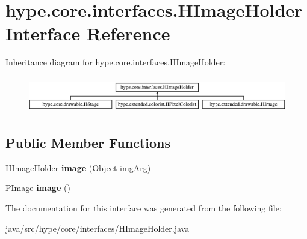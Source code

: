 \hypertarget{interfacehype_1_1core_1_1interfaces_1_1_h_image_holder}{\section{hype.\-core.\-interfaces.\-H\-Image\-Holder Interface Reference}
\label{interfacehype_1_1core_1_1interfaces_1_1_h_image_holder}
}
Inheritance diagram for hype.\-core.\-interfaces.\-H\-Image\-Holder\-:\begin{figure}[H]
\begin{center}
\leavevmode
\includegraphics[height=1.616162cm]{interfacehype_1_1core_1_1interfaces_1_1_h_image_holder}
\end{center}
\end{figure}
\subsection*{Public Member Functions}
\begin{DoxyCompactItemize}
\item 
\hypertarget{interfacehype_1_1core_1_1interfaces_1_1_h_image_holder_a6ef8bf715aa1278f1ada5160d28a4fe9}{\hyperlink{interfacehype_1_1core_1_1interfaces_1_1_h_image_holder}{H\-Image\-Holder} {\bfseries image} (Object img\-Arg)}\label{interfacehype_1_1core_1_1interfaces_1_1_h_image_holder_a6ef8bf715aa1278f1ada5160d28a4fe9}

\item 
\hypertarget{interfacehype_1_1core_1_1interfaces_1_1_h_image_holder_a7dc00ad32182d0c7bf6d11f526b451ba}{P\-Image {\bfseries image} ()}\label{interfacehype_1_1core_1_1interfaces_1_1_h_image_holder_a7dc00ad32182d0c7bf6d11f526b451ba}

\end{DoxyCompactItemize}


The documentation for this interface was generated from the following file\-:\begin{DoxyCompactItemize}
\item 
java/src/hype/core/interfaces/H\-Image\-Holder.\-java\end{DoxyCompactItemize}
